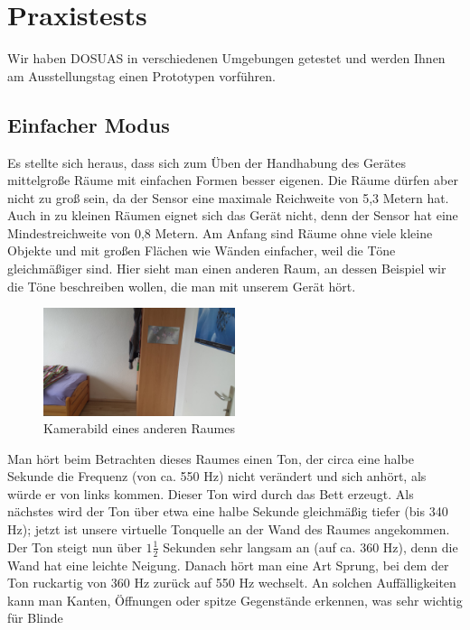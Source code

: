 \documentclass[a4paper,12pt,ngerman]{scrartcl}
\begin{document}
\newpage

\section{Praxistests} \label{testsAndResults}

Wir haben DOSUAS in verschiedenen Umgebungen getestet und werden Ihnen am Ausstellungstag einen Prototypen vorführen.

\subsection{Einfacher Modus}

Es stellte sich heraus, dass sich zum Üben der Handhabung des Gerätes mittelgroße Räume mit einfachen
Formen besser eigenen. Die Räume dürfen aber nicht zu groß sein, da der Sensor eine maximale Reichweite
von 5,3 Metern hat. Auch in zu kleinen Räumen eignet sich das Gerät nicht, denn der Sensor hat eine Mindestreichweite von 0,8 Metern. Am Anfang sind Räume ohne viele kleine Objekte und mit großen 
Flächen wie Wänden einfacher, weil die Töne gleichmäßiger sind.
Hier sieht man einen anderen Raum, an dessen Beispiel wir die Töne beschreiben wollen, die man
mit unserem Gerät hört.
\begin{figure}[H]
	\centering
	\includegraphics[angle=180,width=0.5\textwidth]{20180120_114953}
	\caption{Kamerabild eines anderen Raumes}
	\label{normal_picture}
\end{figure} \par
Man hört beim Betrachten dieses Raumes einen Ton, der circa eine halbe Sekunde die Frequenz (von ca. 550 Hz) nicht verändert und sich anhört, als würde er von links kommen. Dieser Ton wird durch das Bett
erzeugt. Als nächstes wird der Ton über etwa eine halbe Sekunde gleichmäßig tiefer (bis 340 Hz); 
jetzt ist unsere virtuelle Tonquelle an der Wand des Raumes angekommen. Der Ton steigt nun über $1\frac{1}{2}$ Sekunden sehr langsam an (auf ca. 360 Hz), denn die Wand hat eine leichte Neigung. 
Danach hört man eine Art Sprung, bei dem der Ton ruckartig von 360 Hz zurück auf 550 Hz wechselt. An solchen Auffälligkeiten kann man Kanten, Öffnungen oder spitze Gegenstände erkennen, was sehr wichtig für Blinde
\end{document}
